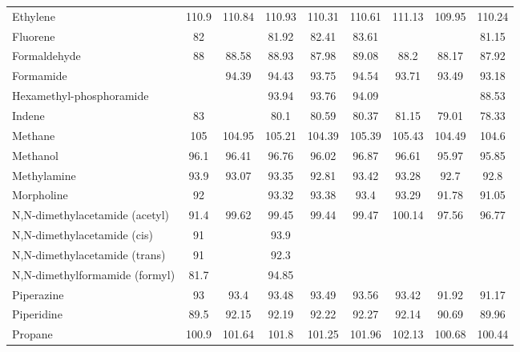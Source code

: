 \begin{longtable}{m{3.1cm} | c c c c c c c c}
 Ethylene                       & 110.9 & 110.84 &    110.93 & 110.31 &  110.61 &   111.13 & 109.95 &  110.24 \\
 Fluorene                       &    82 &        &     81.92 &  82.41 &   83.61 &          &        &   81.15 \\
 Formaldehyde                   &    88 &  88.58 &     88.93 &  87.98 &   89.08 &     88.2 &  88.17 &   87.92 \\
 Formamide                      &       &  94.39 &     94.43 &  93.75 &   94.54 &    93.71 &  93.49 &   93.18 \\
 Hexamethyl-phosphoramide        &       &        &     93.94 &  93.76 &   94.09 &          &        &   88.53 \\
 Indene                         &    83 &        &      80.1 &  80.59 &   80.37 &    81.15 &  79.01 &   78.33 \\
 Methane                        &   105 & 104.95 &    105.21 & 104.39 &  105.39 &   105.43 & 104.49 &   104.6 \\
 Methanol                       &  96.1 &  96.41 &     96.76 &  96.02 &   96.87 &    96.61 &  95.97 &   95.85 \\
 Methylamine                    &  93.9 &  93.07 &     93.35 &  92.81 &   93.42 &    93.28 &   92.7 &    92.8 \\
 Morpholine                     &    92 &        &     93.32 &  93.38 &    93.4 &    93.29 &  91.78 &   91.05 \\
 N,N-dimethylacetamide (acetyl) &  91.4 &  99.62 &     99.45 &  99.44 &   99.47 &   100.14 &  97.56 &   96.77 \\
 N,N-dimethylacetamide (cis)    &    91 &        &      93.9 &        &         &          &        &         \\
 N,N-dimethylacetamide (trans)  &    91 &        &      92.3 &        &         &          &        &         \\
 N,N-dimethylformamide (formyl) &  81.7 &        &     94.85 &        &         &          &        &         \\
 Piperazine                     &    93 &   93.4 &     93.48 &  93.49 &   93.56 &    93.42 &  91.92 &   91.17 \\
 Piperidine                     &  89.5 &  92.15 &     92.19 &  92.22 &   92.27 &    92.14 &  90.69 &   89.96 \\
 Propane                        & 100.9 & 101.64 &     101.8 & 101.25 &  101.96 &   102.13 & 100.68 &  100.44 \\

\end{longtable}
